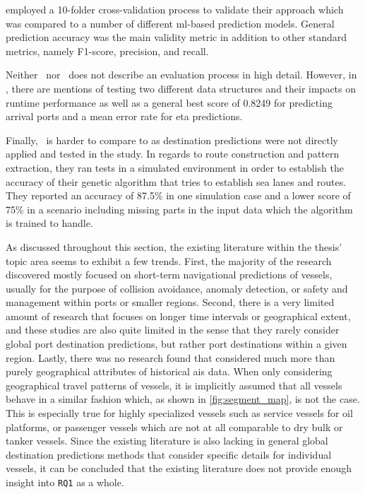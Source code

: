 \cite{Karatas2020TrajectoryData} employed a 10-folder cross-validation process to validate their approach which was compared to a number of different \acrshort{ml}-based prediction models. General prediction accuracy was the main validity metric in addition to other standard metrics, namely F1-score, precision, and recall.

Neither~\cite{Bachar2018GrandDestination} nor~\cite{Rosca2018GrandRoutes} does not describe an evaluation process in high detail. However, in \cite{Rosca2018GrandRoutes}, there are mentions of testing two different data structures and their impacts on runtime performance as well as a general best score of 0.8249 for predicting arrival ports and a mean error rate for \acrshort{eta} predictions.

Finally,~\cite{Dobrkovic2018MaritimeData} is harder to compare to as destination predictions were not directly applied and tested in the study. In regards to route construction and pattern extraction, they ran tests in a simulated environment in order to establish the accuracy of their genetic algorithm that tries to establish sea lanes and routes. They reported an accuracy of 87.5\% in one simulation case and a lower score of 75\% in a scenario including missing parts in the input data which the algorithm is trained to handle.


As discussed throughout this section, the existing literature within the thesis' topic area seems to exhibit a few trends. First, the majority of the research discovered mostly focused on short-term navigational predictions of vessels, usually for the purpose of collision avoidance, anomaly detection, or safety and management within ports or smaller regions. Second, there is a very limited amount of research that focuses on longer time intervals or geographical extent, and these studies are also quite limited in the sense that they rarely consider global port destination predictions, but rather port destinations within a given region. Lastly, there was no research found that considered much more than purely geographical attributes of historical \acrshort{ais} data. When only considering geographical travel patterns of vessels, it is implicitly assumed that all vessels behave in a similar fashion which, as shown in \cref{fig:segment_map}, is not the case. This is especially true for highly specialized vessels such as service vessels for oil platforms, or passenger vessels which are not at all comparable to dry bulk or tanker vessels. Since the existing literature is also lacking in general global destination predictions methods that consider specific details for individual vessels, it can be concluded that the existing literature does not provide enough insight into \texttt{RQ1} as a whole.

